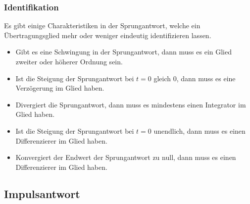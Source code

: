 \subsubsection{Identifikation}
Es gibt einige Charakteristiken in der Sprungantwort, welche ein
Übertragungsglied mehr oder weniger eindeutig identifizieren lassen.

\begin{itemize}
    \item Gibt es eine Schwingung in der Sprungantwort, dann muss es 
        ein Glied zweiter oder höherer Ordnung sein.
    \item Ist die Steigung der Sprungantwort bei $t=0$ gleich $0$, dann
        muss es eine Verzögerung im Glied haben.
    \item Divergiert die Sprungantwort, dann muss es mindestens einen
        Integrator im Glied haben. 
    \item Ist die Steigung der Sprungantwort bei $t=0$ unendlich, dann
        muss es einen Differenzierer im Glied haben.
    \item Konvergiert der Endwert der Sprungantwort zu null, dann muss
        es einen Differenzierer im Glied haben.
\end{itemize}

\subsection{Impulsantwort}

